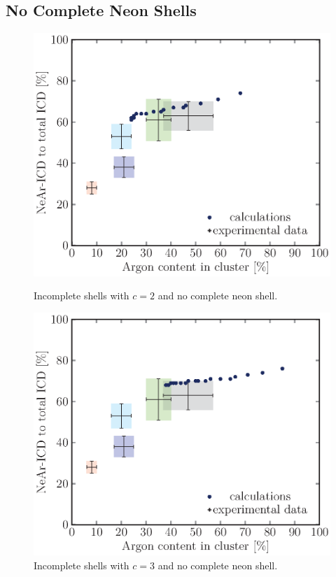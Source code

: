 \subsection{No Complete Neon Shells}
\begin{figure}[!H]
\begin{minipage}{0.48\textwidth}
    \centering
    \includegraphics[scale=0.5]{pics/incompl00_02.ps}
    \caption{Incomplete shells with $c=2$ and no complete neon shell.}
    \label{incompl00_02}
\end{minipage}
\hfill
\begin{minipage}{0.48\textwidth}
    \centering
    \includegraphics[scale=0.5]{pics/incompl00_03.ps}
    \caption{Incomplete shells with $c=3$ and no complete neon shell.}
    \label{incompl00_03}
\end{minipage}
\end{figure}

